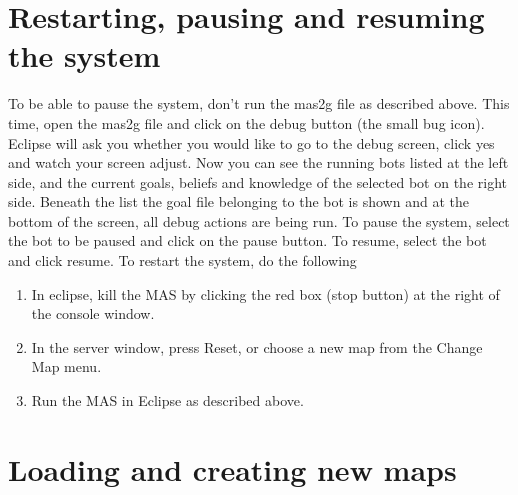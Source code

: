 \documentclass[11pt,a4paper]{article}
\begin{document}
\section{Restarting, pausing and resuming the system}
To be able to pause the system, don’t run the mas2g file as described above.
This time, open the mas2g file and click on the debug button (the small bug icon).
Eclipse will ask you whether you would like to go to the debug screen, click yes and watch your screen adjust.
Now you can see the running bots listed at the left side, and the current goals, beliefs and knowledge of the selected bot on the right side. Beneath the list the goal file belonging to the bot is shown and at the bottom of the screen, all debug actions are being run.
To pause the system, select the bot to be paused and click on the pause button. To resume, select the bot and click resume.
To restart the system, do the following
\begin{enumerate}
\item In eclipse, kill the MAS by clicking the red box (stop button) at the right of the console window.
\item In the server window, press Reset, or choose a new map from the Change Map menu.
\item Run the MAS in Eclipse as described above.
\end{enumerate}

\section{Loading and creating new maps}
\end{document}
